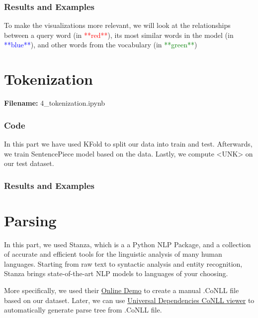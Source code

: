 \documentclass[12pt, a4paper]{article}
\begin{document}
\section*{Results and Examples}
To make the visualizations more relevant, we will look at the relationships between a query word (in \textcolor{red}{**red**}), its most similar words in the model (in \textcolor{blue}{**blue**}), and other words from the vocabulary (in \textcolor{green}{**green**})

\newpage
\part{Tokenization}
\large{\textbf{Filename:} 4\_tokenization.ipynb}

\section*{Code}
In this part we have used KFold to split our data into train and test. Afterwards, we train SentencePiece model based on the data. Lastly, we compute <UNK> on our test dataset. 

\section*{Results and Examples}


\newpage
\part{Parsing}
In this part, we used Stanza, which is a a Python NLP Package, and a collection of accurate and efficient tools for the linguistic analysis of many human languages. Starting from raw text to syntactic analysis and entity recognition, Stanza brings state-of-the-art NLP models to languages of your choosing.

More specifically, we used their \href{http://stanza.run/}{Online Demo} to create a manual .CoNLL file based on our dataset. Later, we can use \href{https://universaldependencies.org/conllu_viewer.html}{Universal Dependencies CoNLL viewer} to automatically generate parse tree from .CoNLL file.
\end{document}
